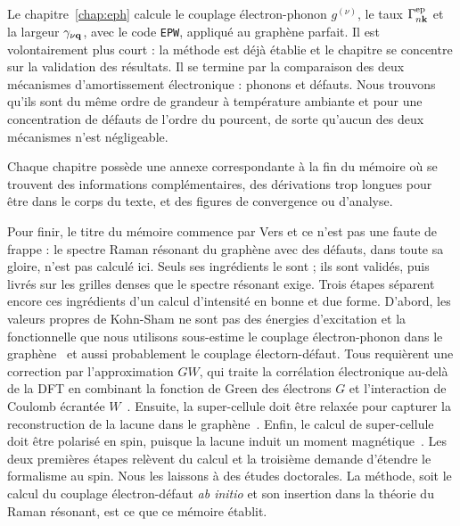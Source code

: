 Le chapitre~\ref{chap:eph} calcule le couplage électron-phonon $g^{(\nu)}$, le taux $\Gamma^\text{ep}_{n\mathbf{k}}$ et la largeur $\gamma_{\nu\mathbf{q}}$, avec le code \texttt{EPW}, appliqué au graphène parfait. Il est volontairement plus court : la méthode est déjà établie et le chapitre se concentre sur la validation des résultats. Il se termine par la comparaison des deux mécanismes d'amortissement électronique : phonons et défauts. Nous trouvons qu'ils sont du même ordre de grandeur à température ambiante et pour une concentration de défauts de l'ordre du pourcent, de sorte qu'aucun des deux mécanismes n'est négligeable.

Chaque chapitre possède une annexe correspondante à la fin du mémoire où se trouvent des informations complémentaires, des dérivations trop longues pour être dans le corps du texte, et des figures de convergence ou d'analyse. 

\bigskip
\bigskip
\bigskip
Pour finir, le titre du mémoire commence par \og Vers \fg{} et ce n'est pas une faute de frappe : le spectre Raman résonant du graphène avec des défauts, dans toute sa gloire, n'est pas calculé ici. Seuls ses ingrédients le sont ; ils sont validés, puis livrés sur les grilles denses que le spectre résonant exige. Trois étapes séparent encore ces ingrédients d'un calcul d'intensité en bonne et due forme. D'abord, les valeurs propres de Kohn-Sham ne sont pas des énergies d'excitation et la fonctionnelle que nous utilisons sous-estime le couplage électron-phonon dans le graphène~\cite{lazzeriImpactElectronelectronCorrelation2008} et aussi probablement le couplage électorn-défaut. Tous requièrent une correction par l'approximation $GW$, qui traite la corrélation électronique au-delà de la DFT en combinant la fonction de Green des électrons $G$ et l'interaction de Coulomb écrantée $W$~\cite{hedinNewMethodCalculating1965}. Ensuite, la super-cellule doit être relaxée pour capturer la reconstruction de la lacune dans le graphène~\cite{el-barbaryStructureEnergeticsVacancy2003,banhartStructuralDefectsGraphene2011}. Enfin, le calcul de super-cellule doit être polarisé en spin, puisque la lacune induit un moment magnétique~\cite{yazyevDefectinducedMagnetismGraphene2007}. Les deux premières étapes relèvent du calcul et la troisième demande d'étendre le formalisme au spin. Nous les laissons à des études doctorales. La méthode, soit le calcul du couplage électron-défaut \textit{ab initio} et son insertion dans la théorie du Raman résonant, est ce que ce mémoire établit.